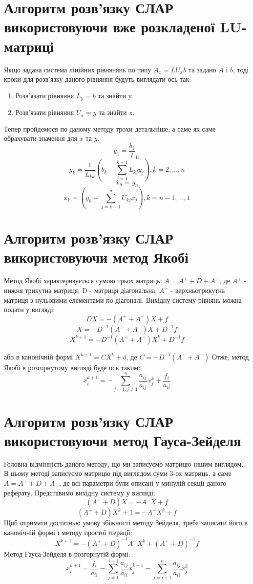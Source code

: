 \documentclass[12pt,a4paper]{article}
\begin{document}
 \section*{Алгоритм розв'язку СЛАР використовуючи вже розкладеної LU-матриці}
 \hspace{1 cm} Якщо задана система лінійних рівнянянь по типу \(A_{x} = LU_{x} b\) та задано \(A\) і \(b\), тоді кроки для розв'язку даного рівняння будуть виглядати ось так:
 \begin{enumerate}
    \item Розв'язати рівняння \(L_{y} = b\) та знайти y.
    \item Розв'язати рівняння \(U_{x} = y\) та знайти x.
 \end{enumerate}
 \hspace{1 cm} Тепер пройдемося по даному методу трохи детальніше, а саме як саме обрахувати значення для \(x\) та \(y\).
 \[ y_1 = \dfrac{b_1}l_{11} \] 
 \[ y_k = \dfrac{1}{L_{kk}} (b_k - \sum_{j=1}^{k-1} L_{kj} y_{j}), k=2, ..., n \]
 \[ x_n = y_n \]
 \[ x_k = (y_k - \sum_{j=k+1}^{n} U_{kj} x_j), k=n-1, ..., 1 \]

 \section*{Алгоритм розв'язку СЛАР використовуючи метод Якобі}
 \hspace{1 cm} Метод Якобі характеризується сумою трьох матриць: \(A = A^{+} + D + A^{-}\), де \(A^{+}\) - нижня трикутна матриця, D - матриця діагональна, \(A^{-}\) - верхньотрикутна матриця з нульовими елементами по діагоналі. Вихідну систему рівнянь можна подати у вигляді:
 \[ DX = -(A^{+} + A^{-}) X + f\]
 \[X = -D^{-1} (A^{+} + A^{-}) X + D^{-1} f\]
 \[X^{k+1} = -D^{-1} (A^{+} + A^{-}) X^{k} + D^{-1} f\]
 \begin{center}
    або в канонічній формі
    \( X^{k+1} = CX^{k} + d \), де \(C = -D^{-1} (A^{+} + A^{-})\)
    Отже, метод Якобі в розгорнутому вигляді буде ось таким:
    \[ x_i^{k+1} = - \sum_{j=1, j \ne 1}^{n} \dfrac{a_{ij}}{a_{ij}} x_j^k + \frac{f_i}{a_{ii}}\]
 \end{center}

 \section*{Алгоритм розв'язку СЛАР використовуючи метод Гауса-Зейделя}
 \hspace{1 cm} Головна відмінність даного методу, що ми записуємо матрицю іншим виглядом. В цьому методі записуємо матрицю під виглядом суми 3-ох матриць, а саме \(A = A^+ + D +A^- \), де всі параметри були описані у минулій секції даного реферату. Представимо вихідну систему у вигляді:
 \[ (A^+ + D) X = -A^- X +f \]
 \[ (A^+ + D) X^k+1 = -A^- X^k +f \]
 Щоб отримати достатнью умову збіжності методу Зейделя, треба записати його в канонічній формі i методу простої iтерації:
 \[ X^{k+1} = - (A^+ + D)^{-1} A^- X^k + (A^+ + D)^{-1} f \]
 Метод Гауса-Зейделя в розгорнутій формі:
 \[ x_i^{k+1} = \frac{f_i}{a_{ii}} - \sum_{j=1}^{i-1} \frac{a_{ij}}{a_{ii}} x_j^{k+1} - \sum_{j=i+1}^{n} \frac{a_{ij}}{a_{ii}} x_j^k \]
\end{document}
